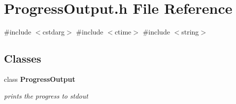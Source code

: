 \section{Progress\+Output.\+h File Reference}
\label{ProgressOutput_8h}
{\ttfamily \#include $<$cstdarg$>$}\newline
{\ttfamily \#include $<$ctime$>$}\newline
{\ttfamily \#include $<$string$>$}\newline
\subsection*{Classes}
\begin{DoxyCompactItemize}
\item 
class \textbf{ Progress\+Output}
\begin{DoxyCompactList}\small\item\em prints the progress to stdout \end{DoxyCompactList}\end{DoxyCompactItemize}
